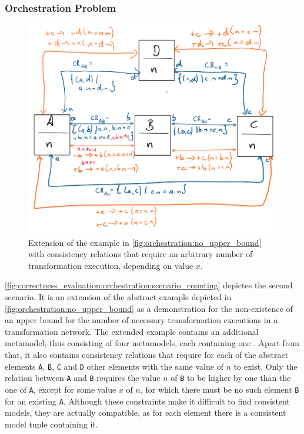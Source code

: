 

\subsubsection*{Orchestration Problem}

\begin{figure}
    \centering
    \includegraphics[width=\textwidth]{figures/correctness/evaluation/orchestration_scenario_counting.png}
    \caption[Example scenario with arbitrary execution bound]{Extension of the example in \autoref{fig:orchestration:no_upper_bound} with consistency relations that require an arbitrary number of transformation execution, depending on value $x$.}
    \label{fig:correctness_evaluation:orchestration:scenario_counting}
\end{figure}

\autoref{fig:correctness_evaluation:orchestration:scenario_counting} depictes the second scenario.
It is an extension of the abstract example depicted in \autoref{fig:orchestration:no_upper_bound} as a demonstration for the non-existence of an upper bound for the number of necessary transformation executions in a transformation network.
The extended example contains an additional metamodel, thus consisting of four metamodels, each containing one \metaclass. 
Apart from that, it also contains consistency relations that require for each of the abstract elements \texttt{A}, \texttt{B}, \texttt{C} and \texttt{D} other elements with the same value of $n$ to exist.
Only the relation between \texttt{A} and \texttt{B} requires the value $n$ of \texttt{B} to be higher by one than the one of \texttt{A}, except for some value $x$ of $n$, for which there must be no such element \texttt{B} for an existing \texttt{A}.
Although these constraints make it difficult to find consistent models, they are actually compatible, as for each element there is a consistent model tuple containing it.

